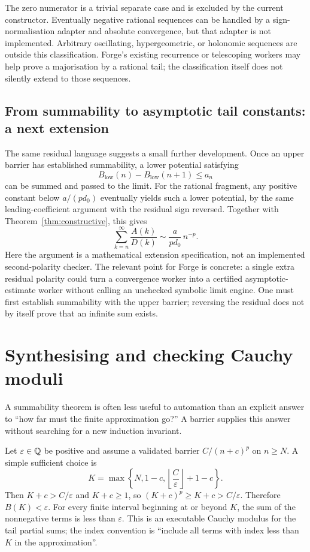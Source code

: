 \documentclass[11pt,a4paper]{article}
\theoremstyle{definition}\newtheorem{definition}[theorem]{Definition}
\begin{document}
The zero numerator is a trivial separate case and is excluded by the current
constructor. Eventually negative rational sequences can be handled by a
sign-normalisation adapter and absolute convergence, but that adapter is not
implemented. Arbitrary oscillating, hypergeometric, or holonomic sequences are
outside this classification. Forge's existing recurrence or telescoping workers
may help prove a majorisation by a rational tail; the classification itself does
not silently extend to those sequences.

\subsection{From summability to asymptotic tail constants: a next extension}

The same residual language suggests a small further development. Once an upper
barrier has established summability, a lower potential satisfying
\[
 B_{\mathrm{low}}(n)-B_{\mathrm{low}}(n+1)\le a_n
\]
can be summed and passed to the limit. For the rational fragment, any positive
constant below $a/(p d_0)$ eventually yields such a lower potential, by the same
leading-coefficient argument with the residual sign reversed. Together with
Theorem~\ref{thm:constructive}, this gives
\[
 \sum_{k=n}^{\infty}\frac{A(k)}{D(k)}
 \sim \frac{a}{p d_0}\,n^{-p}.
\]
Here the argument is a mathematical extension specification, not an implemented
second-polarity checker. The relevant point for Forge is concrete: a single
extra residual polarity could turn a convergence worker into a certified
asymptotic-estimate worker without calling an unchecked symbolic limit engine.
One must first establish summability with the upper barrier; reversing the
residual does not by itself prove that an infinite sum exists.

\section{Synthesising and checking Cauchy moduli}
\label{sec:moduli}

A summability theorem is often less useful to automation than an explicit
answer to ``how far must the finite approximation go?'' A barrier supplies this
answer without searching for a new induction invariant.

Let $\varepsilon\in\mathbb Q$ be positive and assume a validated barrier
$C/(n+c)^p$ on $n\ge N$. A simple sufficient choice is
\begin{equation}\label{eq:coarsemodulus}
 K=\max\left\{N,1-c,\left\lfloor\frac C\varepsilon\right\rfloor+1-c\right\}.
\end{equation}
Then $K+c>C/\varepsilon$ and $K+c\ge1$, so
$(K+c)^p\ge K+c>C/\varepsilon$. Therefore $B(K)<\varepsilon$.
For every finite interval beginning at or beyond $K$, the sum of the
nonnegative terms is less than $\varepsilon$. This is an executable Cauchy
modulus for the tail partial sums; the index convention is ``include all terms
with index less than $K$ in the approximation''.
\end{document}
